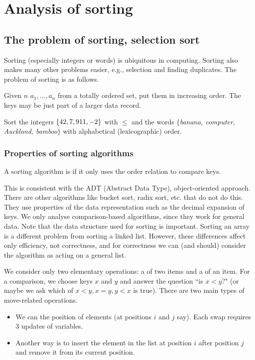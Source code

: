 \part{Analysis of sorting}  
\label{ch:effsort}

\chapter{The problem of sorting, selection sort} %
\label{sec:sortingproblem}
Sorting (especially integers or words) is ubiquitous in computing.
Sorting also makes many other problems easier, e.g., selection and finding duplicates.
The problem of sorting is as follows. 

\begin{Definition}
Given $n$  $a_1, \dots , a_n$ from a totally ordered set, put them in increasing order. 
The keys may be just part of a larger data record.
\end{Definition}
\begin{Boxample}[3]
Sort the integers $\mbox{$\{42, 7, 911, -2\}$}$ with $\leq$ 
and the words $\{$\textit{banana, computer, Auckland, bamboo}$\}$ with  alphabetical (lexicographic) order.
\end{Boxample}



\section{Properties of sorting algorithms}
\begin{Definition}
A sorting algorithm is  if it only uses the order relation to compare keys.
\end{Definition}

This is consistent with the ADT (Abstract Data Type), object-oriented approach. 
There are other algorithms like bucket sort, radix sort, etc. that do not do this. 
They use properties of the data representation such as the decimal expansion of keys.
We only analyse comparison-based algorithms, since they work for general data. Note that the data structure used for sorting is important. 
Sorting an array is a different problem from sorting a linked list. 
However, these differences affect  only efficiency, not correctness, and for correctness we can (and should) consider the algorithm as acting on a general list. 


We consider only two elementary operations: a  of two items and a  of an item.
For a comparison, we choose keys $x$ and $y$ and answer the question ``is $x<y$?" (or maybe we ask which of $x < y, x = y, y < x$ is true). 
There are two main types of move-related operations. 
\begin{itemize}
\item We can  the position of elements (at positions $i$ and $j$ say). 
Each swap requires 3 updates of variables.
\item Another way is to insert the element in the list at position $i$ after position $j$ and remove it from its current position.
\end{itemize}

